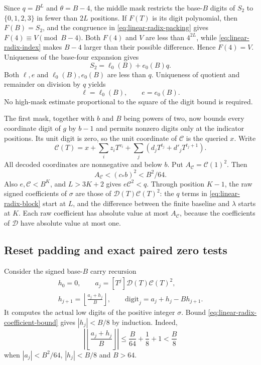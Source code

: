Since $q=B^L$ and $\theta=B-4$, the middle mask restricts the
base-$B$ digits of $S_2$ to $\{0,1,2,3\}$ in fewer than $2L$
positions. If $F(T)$ is its digit polynomial, then $F(B)=S_2$,
and the congruence in \eqref{eq:linear-radix-packing} gives
$F(4)\equiv V\pmod{B-4}$. Both $F(4)$ and $V$ are less than
$4^{2L}$, while \eqref{eq:linear-radix-index} makes $B-4$
larger than their possible difference. Hence $F(4)=V$.
Uniqueness of the base-four expansion gives
\[
 S_2=\ell_0(B)+e_0(B)q.
\]
Both $\ell,e$ and $\ell_0(B),e_0(B)$ are less than $q$.
Uniqueness of quotient and remainder on division by $q$ yields
\begin{equation}\label{eq:linear-radix-canonical}
 \ell=\ell_0(B),\qquad e=e_0(B).
\end{equation}
No high-mask estimate proportional to the square of the digit
bound is required.

The first mask, together with $b$ and $B$ being powers of two,
now bounds every coordinate digit of $g$ by $b-1$ and permits
nonzero digits only at the indicator positions. Its unit digit
is zero, so the unit coordinate of $\mathcal C$ is the queried
$x$. Write
\[
 \mathcal C(T)=x+\sum_i z_iT^{v_i}
              +\sum_j(d_jT^{t_j}+d'_jT^{t_j+1}).
\]
All decoded coordinates are nonnegative and below $b$. Put
$A_{\mathcal C}=\mathcal C(1)^2$. Then
\begin{equation}\label{eq:linear-radix-coefficient-bound}
 A_{\mathcal C}<(c_*b)^2<B^2/64.
\end{equation}
Also $e,\mathcal C<B^K$, and $L>3K+2$ gives
$e\mathcal C^2<q$. Through position $K-1$, the raw signed
coefficients of $\sigma$ are those of
$\mathcal D(T)\mathcal C(T)^2$: the $q$ terms in
\eqref{eq:linear-radix-block} start at $L$, and the difference
between the finite baseline and $\lambda$ starts at $K$.
Each raw coefficient has absolute value at most $A_{\mathcal C}$,
because the coefficients of $\mathcal D$ have absolute value
at most one.

\subsection{Reset padding and exact paired zero tests}

Consider the signed base-$B$ carry recursion
\begin{equation}\label{eq:linear-radix-carry}
 \begin{gathered}
 h_0=0,\qquad a_j=[T^j]\mathcal D(T)\mathcal C(T)^2,\\
 h_{j+1}=\left\lfloor\frac{a_j+h_j}{B}\right\rfloor,
 \qquad \mathrm{digit}_j=a_j+h_j-Bh_{j+1}.
 \end{gathered}
\end{equation}
It computes the actual low digits of the positive integer
$\sigma$. Bound \eqref{eq:linear-radix-coefficient-bound}
gives $|h_j|<B/8$ by induction. Indeed,
\[
 \left|\left\lfloor\frac{a_j+h_j}{B}\right\rfloor\right|
 \le \frac B{64}+\frac18+1<\frac B8
\]
when $|a_j|<B^2/64$, $|h_j|<B/8$ and $B>64$.


